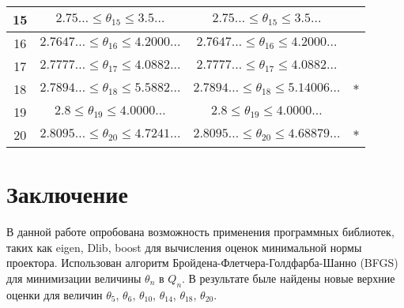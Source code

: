 \documentclass[12pt, a4paper]{extarticle}
\begin{document}
\begin{center}
\begin{tabular}{|c|c|c|c|}
		15 & $2.75\ldots\leqslant\theta_{15}\leqslant3.5\dots$&  $2.75\ldots\leqslant\theta_{15}\leqslant3.5\dots$ & \\ \hline
		16 & $2.7647\ldots\leqslant\theta_{16}\leqslant4.2000\dots$ & $2.7647\ldots\leqslant\theta_{16}\leqslant4.2000\dots$ & \\ \hline
		17 &$2.7777\ldots\leqslant\theta_{17}\leqslant4.0882\dots$ &$2.7777\ldots\leqslant\theta_{17}\leqslant4.0882\dots$ &  \\ \hline
		18 & $2.7894\ldots\leqslant\theta_{18}\leqslant5.5882\dots$& $2.7894\ldots\leqslant\theta_{18}\leqslant5.14006\dots$ &  $*$\\ \hline
		19 &$2.8\leqslant\theta_{19}\leqslant4.0000\dots$ & $2.8\leqslant\theta_{19}\leqslant4.0000\dots$ & \\ \hline
		20 &$2.8095\ldots\leqslant\theta_{20}\leqslant4.7241\dots$ &$2.8095\ldots\leqslant\theta_{20}\leqslant4.68879\dots$ &  $*$ \\ \hline
	\end{tabular}
\end{center}

\newpage
\section{Заключение} 
В данной работе опробована возможность применения программных библиотек, таких как eigen, Dlib, boost для вычисления оценок минимальной нормы проектора. Использован алгоритм Бройдена-Флетчера-Голдфарба-Шанно (BFGS) для минимизации величины $\theta_n$ в $Q_n$. В результате быле найдены новые верхние оценки для величин  $\theta_5$, $\theta_6$,  $\theta_{10}$, $\theta_{14}$, $\theta_{18}$, $\theta_{20}$.  
\end{document}
